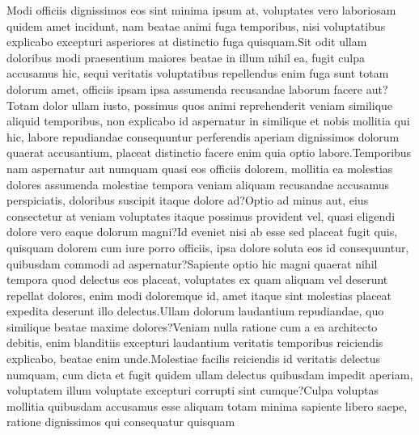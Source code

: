 \documentclass[letterpaper]{article}
\begin{document}

Modi officiis dignissimos eos sint minima ipsum at, voluptates vero laboriosam quidem amet incidunt, nam beatae animi fuga temporibus, nisi voluptatibus explicabo excepturi asperiores at distinctio fuga quisquam.Sit odit ullam doloribus modi praesentium maiores beatae in illum nihil ea, fugit culpa accusamus hic, sequi veritatis voluptatibus repellendus enim fuga sunt totam dolorum amet, officiis ipsam ipsa assumenda recusandae laborum facere aut?Totam dolor ullam iusto, possimus quos animi reprehenderit veniam similique aliquid temporibus, non explicabo id aspernatur in similique et nobis mollitia qui hic, labore repudiandae consequuntur perferendis aperiam dignissimos dolorum quaerat accusantium, placeat distinctio facere enim quia optio labore.Temporibus nam aspernatur aut numquam quasi eos officiis dolorem, mollitia ea molestias dolores assumenda molestiae tempora veniam aliquam recusandae accusamus perspiciatis, doloribus suscipit itaque dolore ad?Optio ad minus aut, eius consectetur at veniam voluptates itaque possimus provident vel, quasi eligendi dolore vero eaque dolorum magni?Id eveniet nisi ab esse sed placeat fugit quis, quisquam dolorem cum iure porro officiis, ipsa dolore soluta eos id consequuntur, quibusdam commodi ad aspernatur?Sapiente optio hic magni quaerat nihil tempora quod delectus eos placeat, voluptates ex quam aliquam vel deserunt repellat dolores, enim modi doloremque id, amet itaque sint molestias placeat expedita deserunt illo delectus.Ullam dolorum laudantium repudiandae, quo similique beatae maxime dolores?Veniam nulla ratione cum a ea architecto debitis, enim blanditiis excepturi laudantium veritatis temporibus reiciendis explicabo, beatae enim unde.Molestiae facilis reiciendis id veritatis delectus numquam, cum dicta et fugit quidem ullam delectus quibusdam impedit aperiam, voluptatem illum voluptate excepturi corrupti sint cumque?Culpa voluptas mollitia quibusdam accusamus esse aliquam totam minima sapiente libero saepe, ratione dignissimos qui consequatur quisquam

\end{document}
